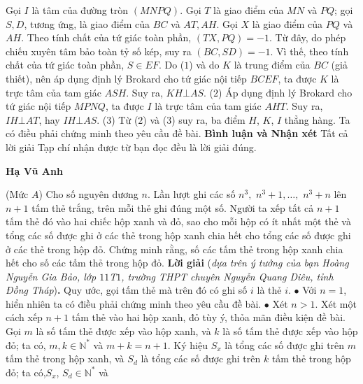 \begin{multicols}{2}
	\vskip 0.05cm
	Gọi $I$ là tâm của đường tròn $(MNPQ)$.
	\vskip 0.05cm
	Gọi $T$ là giao điểm của $MN$ và $PQ$; gọi $S, D$, tương ứng, là giao điểm của $BC$ và $AT, AH$.
	\vskip 0.05cm
	Gọi $X$ là giao điểm của $PQ$ và $AH$. Theo tính chất của tứ giác toàn phần, $(TX, PQ) = -1$. Từ đây, do phép chiếu xuyên tâm bảo toàn tỷ số kép, suy ra $(BC, SD) = -1$.  Vì thế, theo tính chất của tứ giác toàn phần, $S \in EF$.
	\vskip 0.05cm
	Do ($1$) và do $K$ là trung điểm của $BC$ (giả thiết), nên áp dụng định lý Brokard cho tứ giác nội tiếp $BCEF$, ta được $K$ là trực tâm của tam giác $ASH$. Suy ra, $KH \bot AS$. \hfill ($2$)
	\vskip 0.05cm
	Áp dụng định lý Brokard cho tứ giác nội tiếp $MPNQ$, ta được $I$ là trực tâm của tam giác $AHT$. Suy ra, $IH \bot AT$, hay $IH \bot AS$. \hfill ($3$)
	\vskip 0.05cm
	Từ ($2$) và ($3$) suy ra, ba điểm $H$, $K$, $I$ thẳng hàng. Ta có điều phải chứng minh theo yêu cầu đề bài.
	\vskip 0.05cm
	\textbf{\color{thachthuctoanhoc}Bình luận và Nhận xét}
	\vskip 0.05cm
	Tất cả lời giải Tạp chí nhận được từ bạn đọc đều là lời giải đúng.
	\begin{flushright}
		\textbf{\color{thachthuctoanhoc}Hạ Vũ Anh}
	\end{flushright}
	(Mức $A$) Cho số nguyên dương $n$. Lần lượt ghi các số $n^3,$ $n^3+1,\ldots,$ $n^3+n$ lên $n+1$ tấm thẻ trắng, trên mỗi thẻ ghi đúng một số. Người ta xếp tất cả $n+1$ tấm thẻ đó vào hai chiếc hộp xanh và đỏ, sao cho mỗi hộp có ít nhất một thẻ và  tổng các số được ghi ở các thẻ trong hộp xanh chia hết cho tổng các số được ghi ở các thẻ trong hộp đỏ. Chứng minh rằng, số các tấm thẻ trong hộp xanh chia hết cho số các tấm thẻ trong hộp đỏ.
	\vskip 0.05cm
	\textbf{\color{thachthuctoanhoc}Lời giải} (\textit{dựa trên ý tưởng của bạn Hoàng Nguyễn Gia Bảo, lớp $11$T$1$, trường THPT chuyên Nguyễn Quang Diêu, tỉnh Đồng Tháp})\textbf{\color{thachthuctoanhoc}.}
	\vskip 0.05cm
	Quy ước, gọi tấm thẻ mà trên đó có ghi số $i$ là thẻ $i$.
	\vskip 0.05cm
	$\bullet$ Với $n = 1$, hiển nhiên ta có điều phải chứng minh theo yêu cầu đề bài.
	\vskip 0.05cm
	$\bullet$ Xét $n > 1$.
	\vskip 0.05cm
	Xét một cách xếp $n + 1$ tấm thẻ vào hai hộp xanh, đỏ tùy ý, thỏa mãn điều kiện đề bài.
	\vskip 0.05cm
	Gọi $m$ là số tấm thẻ được xếp vào hộp xanh, và $k$ là số tấm thẻ được xếp vào hộp đỏ; ta có,  $m, k \in \mathbb{N^*}$ và $m + k = n + 1$.
	\vskip 0.05cm
	Ký hiệu  $S_x$ là tổng các số được ghi trên $m$ tấm thẻ trong hộp xanh, và $S_d$ là tổng các số được ghi trên $k$ tấm thẻ trong hộp đỏ; ta có,\linebreak $S_x$, $S_d \in \mathbb{N^*}$  và
	\begin{align*}

\end{align*}
\end{multicols}
